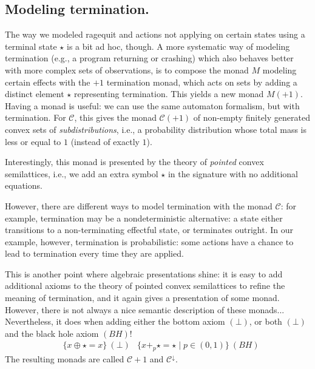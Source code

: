 \documentclass{article}
\newcommand{\Th}{\mathtt{Th}}
\begin{document}


\subsection{Modeling termination.}
The way we modeled ragequit and actions not applying on certain states using a terminal state $\star$ is a bit ad hoc, though. A more systematic way of modeling termination (e.g., a program returning or crashing) which also behaves better with more complex sets of observations, is to compose the monad $M$ modeling certain effects with the $+1$ termination monad, which acts on sets by adding a distinct element $\star$ representing termination. This yields a new monad $M(+1)$. Having a monad is useful: we can use the same automaton formalism, but with termination. 
For $\mathcal C$, this gives the monad \(\mathcal{C}(+1)\) of non-empty finitely generated convex sets of \emph{subdistributions}, i.e., a probability distribution whose total mass is less or equal to $1$ (instead of exactly $1$).

Interestingly, this monad is presented by the theory of \emph{pointed} convex semilattices, i.e., we add an extra symbol $\star$ in the signature with no additional equations. 

However, there are different ways to model termination with the monad $\mathcal C$: for example, termination may be a nondeterministic alternative: a state either transitions to a non-terminating effectful state, or terminates outright. In our example, however, termination is probabilistic: some actions have a chance to lead to termination every time they are applied.


This is another point where algebraic presentations shine: it is easy to add additional axioms to the theory of pointed convex semilattices to refine the meaning of termination, and it again gives a presentation of some monad. However, there is not always a nice semantic description of these monads... Nevertheless, it does when adding either the bottom axiom $(\bot)$, or both $(\bot)$ and the black hole axiom $(BH)$!
\begin{align*}
    &\{x \oplus \star = x\}\ (\bot) &\{x +_p \star = \star \mid p \in (0, 1)\}\ (BH)
\end{align*} %
The resulting monads are called $\mathcal C+1$ and $\mathcal C^\downarrow$.
    
\end{document}

